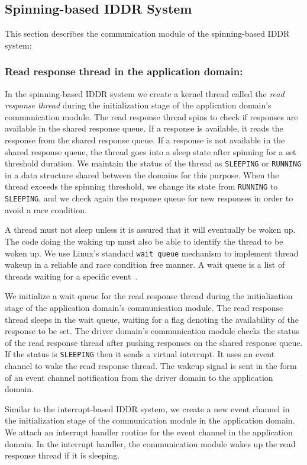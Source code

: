 \subsection{Spinning-based IDDR System}
This section describes the communication module of the spinning-based IDDR system:

\subsubsection*{Read response thread in the application domain:} 
In the spinning-based IDDR system we create a kernel thread called the \textit{read
response thread} during the initialization stage of the application domain's 
communication module. The read response thread spins
to check if responses are available in the shared response queue. If a
response is available, it reads the response from the shared response
queue.  If a response is not available in the shared response
queue, the thread goes into a sleep state after spinning for a set threshold duration. 
We maintain the status of the thread as \texttt{SLEEPING} or \texttt{RUNNING}
in a data structure shared between the domains for this purpose. 
When the thread exceeds the spinning threshold, we change
its state from \texttt{RUNNING} to \texttt{SLEEPING}, and we check again the
response queue for new responses in order to avoid a race condition.

A thread must not sleep unless it is assured that it will eventually be woken up.
The code doing the waking up must also be able to 
identify the thread to be woken up.  We use Linux's standard \texttt{wait queue} mechanism
to implement thread wakeup in a reliable and race condition free manner.
A wait queue is a list of threads waiting for a specific event~\cite{Galvin, Bovet:2005:ULK:1077084}. 

We initialize a wait queue for the read response thread during the initialization stage 
of the application domain's communication module. The read response thread sleeps 
in the wait queue, waiting for a flag denoting the availability of the response to be set. 
The driver domain's communication module checks the status of the read response 
thread after pushing responses on the shared response queue. If the status is 
\texttt{SLEEPING} then it sends a virtual interrupt. It uses an event channel to wake the read
response thread. The wakeup signal is sent in the form of an event channel notification 
from the driver domain to the application domain. 

Similar to the interrupt-based IDDR system, we create a new event channel in
the initialization stage of the communication module in the application
domain. We attach an interrupt handler routine for the event channel
in the application domain. In the interrupt handler, the communication
module wakes up the read response thread if it is sleeping.

